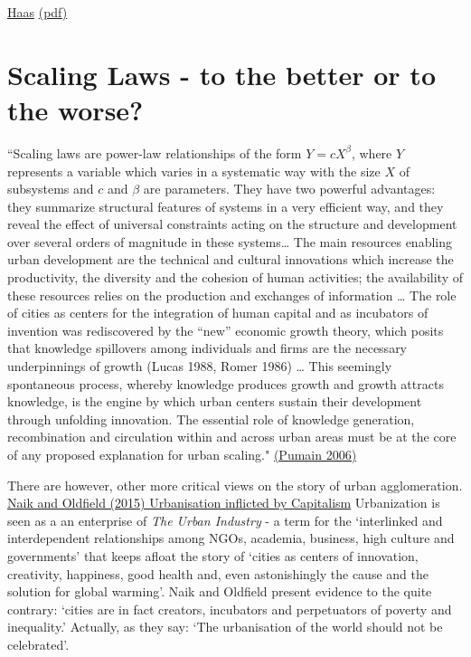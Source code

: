 \documentclass[
]{book}
\begin{document}
\href{https://journals.plos.org/plosone/article?id=10.1371/journal.pone.0140127}{Haas}
\href{pdf/Haas_2015_Prehistoric_Settlement_Size_Scaling.pdf}{(pdf)}

\hypertarget{scaling-laws---to-the-better-or-to-the-worse}{%
\section{Scaling Laws - to the better or to the worse?}\label{scaling-laws---to-the-better-or-to-the-worse}}

``Scaling laws are power-law relationships of the form \(Y = cX^β\), where \(Y\) represents a
variable which varies in a systematic way with the size \(X\) of subsystems and \(c\) and \(β\) are
parameters. They have two powerful advantages: they summarize structural features of
systems in a very efficient way, and they reveal the effect of universal constraints acting
on the structure and development over several orders of magnitude in these systems\ldots{}
The main resources enabling urban
development are the technical and cultural innovations which increase the productivity,
the diversity and the cohesion of human activities; the availability of these resources
relies on the production and exchanges of information \ldots{}
The role of cities as centers for the integration of human capital and as incubators
of invention was rediscovered by the ``new'' economic growth theory, which posits that
knowledge spillovers among individuals and firms are the necessary underpinnings of
growth (Lucas 1988, Romer 1986) \ldots{}
This seemingly spontaneous
process, whereby knowledge produces growth and growth attracts knowledge, is the
engine by which urban centers sustain their development through unfolding innovation.
The essential role of knowledge generation, recombination and circulation within and
across urban areas must be at the core of any proposed explanation for urban scaling."
\href{https://journals.openedition.org/cybergeo/2519}{(Pumain 2006)}

There are however, other more critical views on the story of urban agglomeration.
\href{https://www.citymetric.com/horizons/urbanisation-not-natural-or-inevitable-its-being-inflicted-upon-us-forces-capitalism-900}{Naik and Oldfield (2015) Urbanisation inflicted by Capitalism}
Urbanization is seen as a an enterprise of \emph{The Urban Industry} - a term for the
`interlinked and interdependent relationships among NGOs, academia, business, high culture and governments' that keeps afloat the story of `cities as centers of innovation, creativity, happiness, good health and, even astonishingly the cause and the solution for global warming'. Naik and Oldfield
present evidence to the quite contrary: `cities are in fact creators, incubators and perpetuators of poverty and inequality.' Actually, as they say: `The urbanisation of the world should not be celebrated'.
\end{document}
